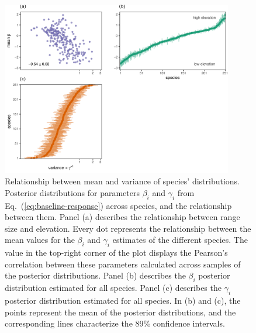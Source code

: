 \documentclass[11pt, a4paper]{article}
\begin{document}
\begin{figure}[h]
  \centering
    \vspace{0.5cm}
    \includegraphics[width=0.9\textwidth]{figures/figure1-prime}
    	  \vspace{0.3cm}
	   \caption{Relationship between mean and variance of species' distributions. Posterior distributions for parameters $\beta_i$ and $\gamma_i$ from Eq.~(\ref{eq:baseline-response}) across species, and the relationship between them. Panel (a) describes the relationship between range size and elevation. Every dot represents the relationship between the mean values for the $\beta_i$ and $\gamma_i$ estimates of the different species. The value in the top-right corner of the plot displays the Pearson's correlation between these parameters calculated across samples of the posterior distributions. Panel (b) describes the $\beta_i$ posterior distribution estimated for all species. Panel (c) describes the $\gamma_i$ posterior distribution estimated for all species. In (b) and (c), the points represent the mean of the posterior distributions, and the corresponding lines characterize the 89\% confidence intervals.}
      \label{fig:correlation}
\end{figure}
\end{document}

